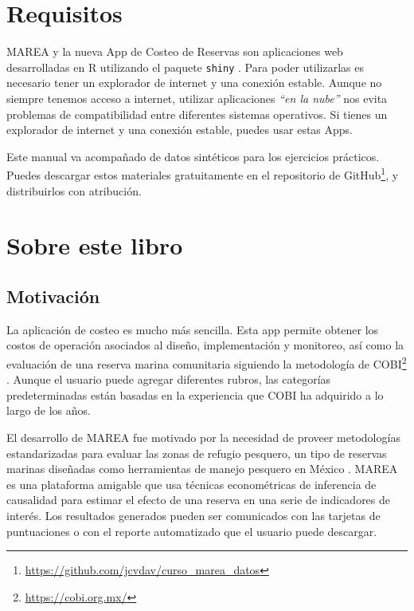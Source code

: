\documentclass[]{krantz}
\renewcommand{\href}[2]{#2\footnote{\url{#1}}}
\begin{document}
\hypertarget{requisitos}{%
\section{Requisitos}\label{requisitos}}

MAREA y la nueva App de Costeo de Reservas son aplicaciones web desarrolladas en R utilizando el paquete \texttt{shiny} \citep{R-base, R-shiny}. Para poder utilizarlas es necesario tener un explorador de internet y una conexión estable. Aunque no siempre tenemos acceso a internet, utilizar aplicaciones \emph{``en la nube''} nos evita problemas de compatibilidad entre diferentes sistemas operativos. Si tienes un explorador de internet y una conexión estable, puedes usar estas Apps.

Este manual va acompañado de datos sintéticos para los ejercicios prácticos. Puedes descargar estos materiales gratuitamente en el \href{https://github.com/jcvdav/curso_marea_datos}{repositorio de GitHub}, y distribuirlos con atribución.

\hypertarget{sobre-este-libro}{%
\section{Sobre este libro}\label{sobre-este-libro}}

\hypertarget{motivacion}{%
\subsection{Motivación}\label{motivacion}}

La aplicación de costeo es mucho más sencilla. Esta app permite obtener los costos de operación asociados al diseño, implementación y monitoreo, así como la evaluación de una reserva marina comunitaria siguiendo la metodología de \href{https://cobi.org.mx/}{COBI} \citep{uribe_2010}. Aunque el usuario puede agregar diferentes rubros, las categorías predeterminadas están basadas en la experiencia que COBI ha adquirido a lo largo de los años.

El desarrollo de MAREA fue motivado por la necesidad de proveer metodologías estandarizadas para evaluar las zonas de refugio pesquero, un tipo de reservas marinas diseñadas como herramientas de manejo pesquero en México \citep{nom}. MAREA es una plataforma amigable que usa técnicas econométricas de inferencia de causalidad para estimar el efecto de una reserva en una serie de indicadores de interés. Los resultados generados pueden ser comunicados con las tarjetas de puntuaciones o con el reporte automatizado que el usuario puede descargar.
\end{document}
